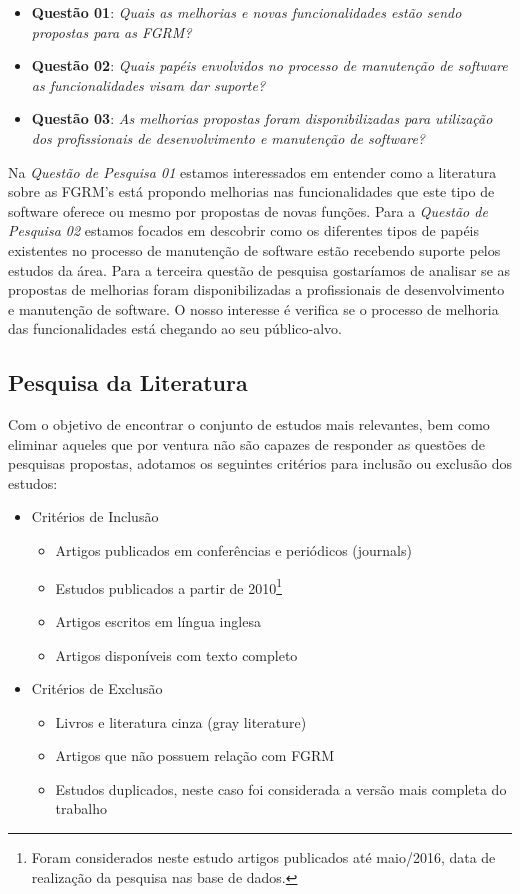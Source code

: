 \begin{itemize}
	\item \textbf{Questão 01}: \textit{Quais as melhorias e novas
			funcionalidades estão sendo propostas para as FGRM?}
   	\item \textbf{Questão 02}: \textit{Quais papéis
			envolvidos no processo de manutenção de software as funcionalidades visam
			dar suporte?}
	\item \textbf{Questão 03}: \textit{As melhorias propostas foram
			disponibilizadas para utilização dos profissionais de
			desenvolvimento e manutenção de software?}
\end{itemize}


Na \textit{Questão de Pesquisa 01} estamos interessados em entender como a
literatura sobre as FGRM's está propondo melhorias nas funcionalidades que este
tipo de software oferece ou mesmo por propostas de novas funções. Para
a \textit{Questão de Pesquisa 02} estamos focados em descobrir como os diferentes
tipos de papéis existentes no processo de manutenção de software estão
recebendo suporte pelos estudos da área. Para a terceira questão de pesquisa
gostaríamos de analisar se as propostas de melhorias foram disponibilizadas a
profissionais de desenvolvimento e manutenção de software. O nosso
interesse é verifica se o processo de melhoria das funcionalidades está chegando
ao seu público-alvo.

\subsection{Pesquisa da Literatura}
\label{subsec:map-pesquisa-literatura}

Com o objetivo de encontrar o conjunto de estudos mais relevantes, bem como
eliminar aqueles que por ventura não são capazes de responder as questões de
pesquisas propostas, adotamos os seguintes critérios para inclusão ou exclusão
dos estudos:

\begin{itemize}
	\item Critérios de Inclusão
		\begin{itemize}
			\item Artigos
				publicados em conferências e periódicos (journals)
			\item Estudos
				publicados a partir de 2010\footnote{Foram considerados neste
					estudo artigos publicados até maio/2016, data de realização
					da pesquisa nas base de dados.}
			\item Artigos escritos em
				língua inglesa
			\item Artigos disponíveis com texto
				completo
		\end{itemize}
	\item Critérios de Exclusão
		\begin{itemize}
			\item Livros e literatura cinza (gray literature)
			\item Artigos que não possuem relação com FGRM
			\item Estudos duplicados, neste caso foi considerada a versão mais
				completa do trabalho
		\end{itemize}
\end{itemize}

